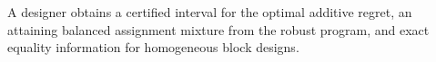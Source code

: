 A designer obtains a certified interval for the optimal additive regret, an attaining balanced assignment mixture from the robust program, and exact equality information for homogeneous block designs.